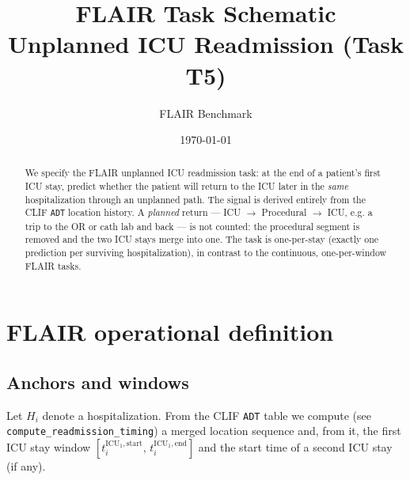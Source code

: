 \documentclass[11pt]{article}
\title{\textbf{FLAIR Task Schematic} \\[0.3em]
       Unplanned ICU Readmission (Task T5)}
\author{FLAIR Benchmark}
\date{\today}
\newcommand{\ticustart}{t^{\text{ICU}_1,\text{start}}}
\newcommand{\ticuend}{t^{\text{ICU}_1,\text{end}}}
\begin{document}
\maketitle

\begin{abstract}
\noindent We specify the FLAIR unplanned ICU readmission task: at the end
of a patient's first ICU stay, predict whether the patient will return to
the ICU later in the \emph{same} hospitalization through an unplanned path.
The signal is derived entirely from the CLIF \texttt{ADT} location history.
A \emph{planned} return --- ICU $\to$ Procedural $\to$ ICU, e.g. a trip to
the OR or cath lab and back --- is not counted: the procedural segment is
removed and the two ICU stays merge into one. The task is one-per-stay
(exactly one prediction per surviving hospitalization), in contrast to the
continuous, one-per-window FLAIR tasks.
\end{abstract}

\section{FLAIR operational definition}
\label{sec:def}

\subsection{Anchors and windows}

Let $H_i$ denote a hospitalization. From the CLIF \texttt{ADT} table we
compute (see \verb|compute_readmission_timing|) a merged location sequence
and, from it, the first ICU stay window
$[\ticustart_i,\, \ticuend_i]$ and the start time of a second ICU stay
(if any).
\end{document}
